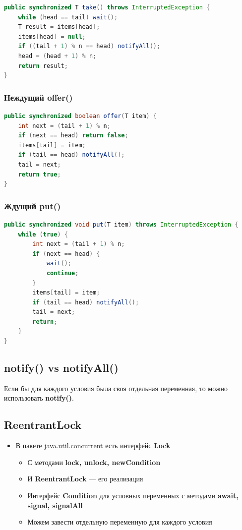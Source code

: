 \documentclass[10pt,a4paper,oneside,titlepage]{article}
\theoremstyle{plain}
\theoremstyle{defenition}
\begin{document}
\begin{lstlisting}[language=Java]
public synchronized T take() throws InterruptedException {
    while (head == tail) wait();
    T result = items[head];
    items[head] = null;
    if ((tail + 1) % n == head) notifyAll();
    head = (head + 1) % n;
    return result;
}
\end{lstlisting}

\subsubsection[offer()]{Неждущий offer()}

\begin{lstlisting}[language=Java]
public synchronized boolean offer(T item) {
    int next = (tail + 1) % n;
    if (next == head) return false;
    items[tail] = item;
    if (tail == head) notifyAll();
    tail = next;
    return true;
}
\end{lstlisting}

\subsubsection[put()]{Ждущий put()}

\begin{lstlisting}[language=Java]
public synchronized void put(T item) throws InterruptedException {
    while (true) {
        int next = (tail + 1) % n;
        if (next == head) {
            wait();
            continue;
        }
        items[tail] = item;
        if (tail == head) notifyAll();
        tail = next;
        return;
    }
}
\end{lstlisting}

\subsection{notify() vs notifyAll()}

Если бы для каждого условия была своя отдельная переменная, то можно использовать {\bfseries notify()}. 

\subsection{ReentrantLock}

\begin{itemize}
	\item В пакете java.util.concurrent есть интерфейс {\bfseries Lock}
	\begin{itemize}
		\item С методами {\bfseries lock, unlock, newCondition}
		\item И {\bfseries ReentrantLock} --- его реализация
		\item Интерфейс {\bfseries Condition} для условных переменных с методами {\bfseries await, signal, signalAll}
		\item Можем завести отдельную переменную для каждого условия
	\end{itemize}
\end{itemize}
\end{document}
